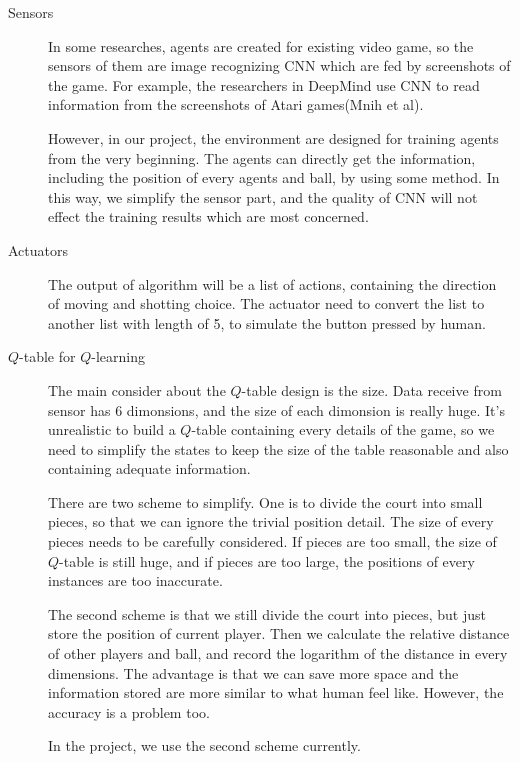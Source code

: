 \documentclass[14pt]{extarticle}
\begin{document}
\begin{description}
	\item[Sensors]
    In some researches, agents are created for existing video game, so the sensors of them are image recognizing CNN which are fed by screenshots of the game. For example, the researchers in DeepMind use CNN to read information from the screenshots of Atari games(Mnih et al).

    However, in our project, the environment are designed for training agents from the very beginning. The agents can directly get the information, including the position of every agents and ball, by using some method. In this way, we simplify the sensor part, and the quality of CNN will not effect the training results which are most concerned.
    
	\item[Actuators]
    The output of algorithm will be a list of actions, containing the direction of moving and shotting choice. The actuator need to convert the list to another list with length of 5, to simulate the button pressed by human. 

    \item[$Q$-table for $Q$-learning]
    The main consider about the $Q$-table design is the size. Data receive from sensor has 6 dimonsions, and the size of each dimonsion is really huge. It's unrealistic to build a $Q$-table containing every details of the game, so we need to simplify the states to keep the size of the table reasonable and also containing adequate information.

    There are two scheme to simplify. One is to divide the court into small pieces, so that we can ignore the trivial position detail. The size of every pieces needs to be carefully considered. If pieces are too small, the size of $Q$-table is still huge, and if pieces are too large, the positions of every instances are too inaccurate.
    
    The second scheme is that we still divide the court into pieces, but just store the position of current player. Then we calculate the relative distance of other players and ball, and record the logarithm of the distance in every dimensions. The advantage is that we can save more space and the information stored are more similar to what human feel like. However, the accuracy is a problem too.

    In the project, we use the second scheme currently.
     
    
\end{description}
\end{document}
